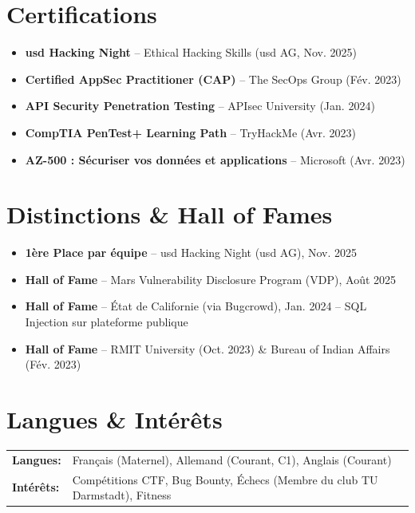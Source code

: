 \documentclass[a4paper,10pt]{article}
\newcommand{\hskills}[1]{\textbf{#1}}
\newenvironment{zitemize}{
    \begin{itemize}[leftmargin=*, labelsep=0.5em, itemsep=0pt, parsep=1pt]
}{\end{itemize}\vspace{-0.2cm}}
\begin{document}
\section{Certifications}
\begin{zitemize}
    \item \textbf{usd Hacking Night} -- Ethical Hacking Skills (usd AG, Nov. 2025)
    \item \textbf{Certified AppSec Practitioner (CAP)} -- The SecOps Group (Fév. 2023)
    \item \textbf{API Security Penetration Testing} -- APIsec University (Jan. 2024)
    \item \textbf{CompTIA PenTest+ Learning Path} -- TryHackMe (Avr. 2023)
    \item \textbf{AZ-500 : Sécuriser vos données et applications} -- Microsoft (Avr. 2023)
\end{zitemize}

\section{Distinctions \& Hall of Fames}
\begin{zitemize}
    \item \textbf{1ère Place par équipe} -- usd Hacking Night (usd AG), Nov. 2025
    \item \textbf{Hall of Fame} -- Mars Vulnerability Disclosure Program (VDP), Août 2025
    \item \textbf{Hall of Fame} -- État de Californie (via Bugcrowd), Jan. 2024 -- SQL Injection sur plateforme publique
    \item \textbf{Hall of Fame} -- RMIT University (Oct. 2023) \& Bureau of Indian Affairs (Fév. 2023)
\end{zitemize}

\section{Langues \& Intérêts}
\begin{tabular}{>{\raggedright\arraybackslash}p{10em} p{38em}}
    \hskills{Langues:} & Français (Maternel), Allemand (Courant, C1), Anglais (Courant) \\
    \hskills{Intérêts:} & Compétitions CTF, Bug Bounty, Échecs (Membre du club TU Darmstadt), Fitness \\
\end{tabular}
\end{document}
